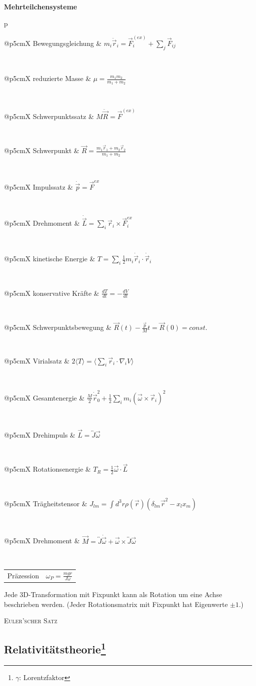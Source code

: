 \documentclass[12pt,a4paper, twoside]{article}
\makeatletter
\renewcommand{\d}[2]{\frac{d #1}{d #2}}
\renewcommand{\=}[1]{\stackrel{#1}{=}}
\theoremstyle{definition}
\theoremstyle{remark}
\newcommand{\concept}[2]{%
\noindent
\begin{framed}
\noindent\textbf{#1}
\par\begin{tabular}{p{\linewidth}}
#2
\end{tabular}
\end{framed}
}
\newcommand{\f}[2]{%
\noindent\begin{tabularx}{\linewidth}{@{}p{5cm}X}
#1 & $#2$
\end{tabularx}}
\makeatother
\begin{document}
\concept{Mehrteilchensysteme}{

\f{Bewegungsgleichung}{m_i \ddot{\vec{r}}_i = \vec{F}_i^{(ex)} + \sum_j \vec{F}_{ij}}\\
\f{reduzierte Masse}{\mu = \frac{m_1 m_2}{m_1 + m_2}}\\
\f{Schwerpunktssatz}{M \ddot{\vec{R}} = \vec{F}^{(ex)}}\\
\f{Schwerpunkt}{\vec{R} = \frac{m_1 \vec{r}_1 + m_2 \vec{r}_2}{m_1 + m_2}}\\
\f{Impulssatz}{\dot{\vec{p}} = \vec{F}^{ex}}\\
\f{Drehmoment}{\dot{\vec{L}} = \sum_i \vec{r}_i \times \vec{F}_i^{ex}}\\
\f{kinetische Energie}{T = \sum_i \frac{1}{2} m_i \dot{\vec{r}}_i \cdot \dot{\vec{r}}_i}\\
\f{konservative Kräfte}{\d{T}{t} = - \d{V}{t}}\\
\f{Schwerpunktsbewegung}{\vec{R}(t) - \frac{\vec{p}}{M}t = \vec{R}(0) = const.}\\
\f{Virialsatz}{2 \langle T \rangle = \langle \sum_i \vec{r}_i \cdot \nabla_i V \rangle}\\
\f{Gesamtenergie}{\frac{M}{2} \dot{\vec{r}}_0^2 + \frac{1}{2} \sum_i m_i (\vec{\omega} \times \vec{r}_i)^2}\\
\f{Drehimpuls}{\vec{L} = \overleftrightarrow{J}\vec{\omega}}\\
\f{Rotationsenergie}{T_R = \frac{1}{2} \vec{\omega} \cdot \vec{L}}\\
\f{Trägheitstensor}{J_{lm} = \int d^3 r \rho(\vec{r}) (\delta_{lm} \vec{r}^2 - x_l x_m)}\\
\f{Drehmoment}{\vec{M} = \overleftrightarrow{J} \dot{\vec{\omega}} + \vec{\omega} \times \overleftrightarrow{J} \vec{\omega}}\\
\f{Präzession}{\omega_P = \frac{m g r}{J \omega}}

}

\begin{center}
\begin{framed}
Jede 3D-Transformation mit Fixpunkt kann als Rotation um eine Achse beschrieben werden. (Jeder Rotationsmatrix mit Fixpunkt hat Eigenwerte $\pm 1$.)
\begin{center}\textsc{Euler'scher Satz}\end{center}
\end{framed}
\end{center}

\subsection[Relativitätstheorie]{Relativitätstheorie\let\thefootnote\relax\footnote{$\gamma$: Lorentzfaktor}}
\end{document}
